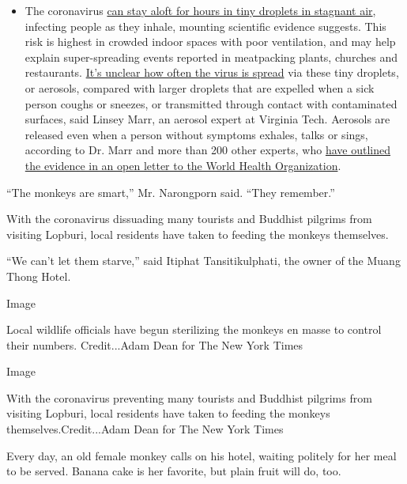 \begin{itemize}
  \begin{itemize}
  \tightlist
  \item
    The coronavirus
    \href{https://www.nytimes.com/2020/07/04/health/239-experts-with-one-big-claim-the-coronavirus-is-airborne.html?action=click\&pgtype=Article\&state=default\&region=MAIN_CONTENT_3\&context=storylines_faq}{can
    stay aloft for hours in tiny droplets in stagnant air}, infecting
    people as they inhale, mounting scientific evidence suggests. This
    risk is highest in crowded indoor spaces with poor ventilation, and
    may help explain super-spreading events reported in meatpacking
    plants, churches and restaurants.
    \href{https://www.nytimes.com/2020/07/06/health/coronavirus-airborne-aerosols.html?action=click\&pgtype=Article\&state=default\&region=MAIN_CONTENT_3\&context=storylines_faq}{It's
    unclear how often the virus is spread} via these tiny droplets, or
    aerosols, compared with larger droplets that are expelled when a
    sick person coughs or sneezes, or transmitted through contact with
    contaminated surfaces, said Linsey Marr, an aerosol expert at
    Virginia Tech. Aerosols are released even when a person without
    symptoms exhales, talks or sings, according to Dr. Marr and more
    than 200 other experts, who
    \href{https://academic.oup.com/cid/article/doi/10.1093/cid/ciaa939/5867798}{have
    outlined the evidence in an open letter to the World Health
    Organization}.
  \end{itemize}
\end{itemize}

``The monkeys are smart,'' Mr. Narongporn said. ``They remember.''

With the coronavirus dissuading many tourists and Buddhist pilgrims from
visiting Lopburi, local residents have taken to feeding the monkeys
themselves.

``We can't let them starve,'' said Itiphat Tansitikulphati, the owner of
the Muang Thong Hotel.

Image

Local wildlife officials have begun sterilizing the monkeys en masse to
control their numbers. Credit...Adam Dean for The New York Times

Image

With the coronavirus preventing many tourists and Buddhist pilgrims from
visiting Lopburi, local residents have taken to feeding the monkeys
themselves.Credit...Adam Dean for The New York Times

Every day, an old female monkey calls on his hotel, waiting politely for
her meal to be served. Banana cake is her favorite, but plain fruit will
do, too.


